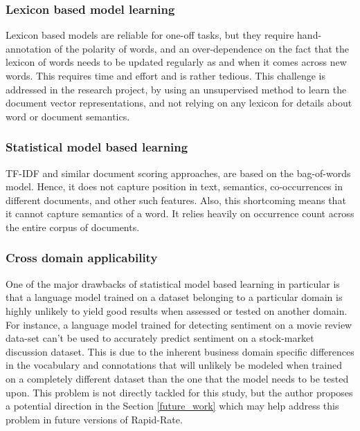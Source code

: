\documentclass[conference]{IEEEtran}
\begin{document}
        \subsubsection{Lexicon based model learning}
            Lexicon based models are reliable for one-off tasks, but they require hand-annotation of the polarity of words, and an over-dependence on the fact that the lexicon of words needs to be updated regularly as and when it comes across new words. 
            This requires time and effort and is rather tedious. 
            This challenge is addressed in the research project, by using an unsupervised method to learn the document vector representations, and not relying on any lexicon for details about word or document semantics.

        \subsubsection{Statistical model based learning}
            TF-IDF and similar document scoring approaches, are based on the bag-of-words model. Hence, it does not capture position in text, semantics, co-occurrences in different documents, and other such features. Also, this shortcoming means that it cannot capture semantics of a word. It relies heavily on occurrence count across the entire corpus of documents.

        \subsubsection{Cross domain applicability} \label{cross_domain_applicability}
            One of the major drawbacks of statistical model based learning in particular is that a language model trained on a dataset belonging to a particular domain is highly unlikely to yield good results when assessed or tested on another domain. 
            For instance, a language model trained for detecting sentiment on a movie review data-set can't be used to accurately predict sentiment on a stock-market discussion dataset. 
            This is due to the inherent business domain specific differences in the vocabulary and connotations that will unlikely be modeled when trained on a completely different dataset than the one that the model needs to be tested upon. 
            This problem is not directly tackled for this study, but the author proposes a potential direction in the Section \ref{future_work} which may help address this problem in future versions of Rapid-Rate.
\end{document}
